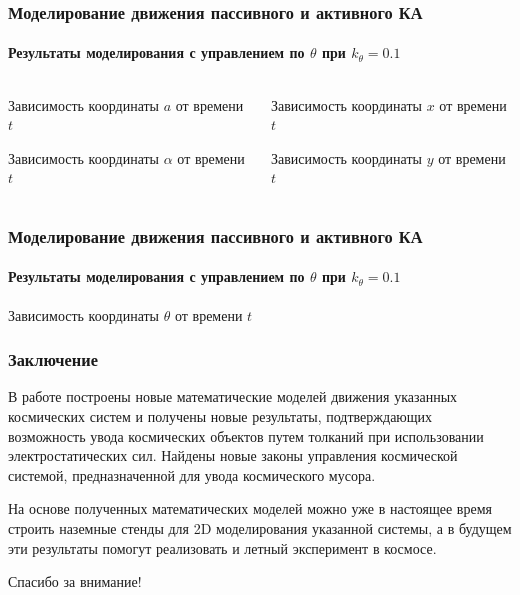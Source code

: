 \documentclass[10pt,pdf,hyperref={unicode}]{beamer}
\begin{document}
\begin{frame}
\frametitle{Моделирование движения пассивного и активного КА}
\framesubtitle{Результаты моделирования с управлением по $\theta$ при $k_\theta = 0.1$}
\begin{columns}[onlytextwidth]
	\begin{column}{0.5\textwidth}
		\begin{figure}[H]
		\end{figure}
		\scriptsize{Зависимость координаты $a$ от времени $t$}
		\begin{figure}[H]
		\end{figure} 
		\scriptsize{Зависимость координаты $\alpha$ от времени $t$}
	\end{column}
	\begin{column}{0.5\textwidth}
		\begin{figure}[H]
		\end{figure} 
		\scriptsize{Зависимость координаты $x$ от времени $t$}
		\begin{figure}[H]
		\end{figure} 
		\scriptsize{Зависимость координаты $y$ от времени $t$}
	\end{column}
\end{columns}
\end{frame}
\begin{frame}
\frametitle{Моделирование движения пассивного и активного КА}
\framesubtitle{Результаты моделирования с управлением по $\theta$ при $k_\theta = 0.1$}
	\begin{figure}[H]
	\end{figure} 
	\begin{center}\scriptsize{Зависимость координаты $\theta$ от времени $t$}\end{center}
\end{frame}

\begin{frame}
\frametitle{Заключение}
В работе построены новые математические моделей движения указанных космических систем и получены новые результаты, подтверждающих возможность увода космических объектов путем толканий при использовании электростатических сил. Найдены новые законы управления космической системой, предназначенной для увода космического мусора.

На основе полученных математических моделей	 можно уже в настоящее время строить наземные стенды для 2D моделирования указанной системы, а в будущем эти результаты помогут реализовать и летный эксперимент в космосе.
\end{frame}

\begin{frame}
	\begin{center}
		Спасибо за внимание!
	\end{center}
\end{frame}
\end{document}
